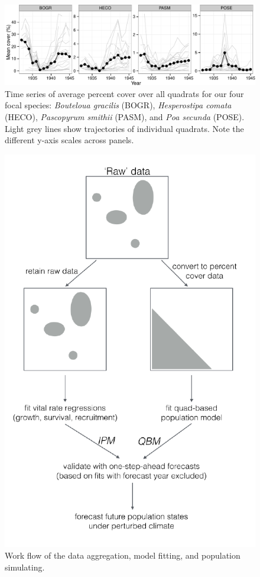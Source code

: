\documentclass[12pt,]{article}
\begin{document}
\begin{figure}[htbp]
\centering
\includegraphics{components/figure/manuscript-figure_1.pdf}
\caption{Time series of average percent cover over all quadrats for our
four focal species: \emph{Bouteloua gracilis} (BOGR), \emph{Hesperostipa
comata} (HECO), \emph{Pascopyrum smithii} (PASM), and \emph{Poa secunda}
(POSE). Light grey lines show trajectories of individual quadrats. Note
the different y-axis scales across panels.}
\end{figure}

\begin{figure}[htbp]
\centering
\includegraphics{components/figure/manuscript-figure_2.pdf}
\caption{Work flow of the data aggregation, model fitting, and
population simulating.}
\end{figure}
\end{document}
